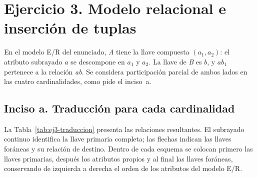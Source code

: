 
\section{Ejercicio 3. Modelo relacional e inserción de tuplas}

En el modelo E/R del enunciado, \emph{A} tiene la llave compuesta
$(a_1,a_2)$: el atributo subrayado $a$ se descompone en $a_1$ y $a_2$.
La llave de \emph{B} es $b$, y $ab_1$ pertenece a la relación \emph{ab}.
Se considera participación parcial de ambos lados en las cuatro
cardinalidades, como pide el inciso~a.

\subsection{Inciso a. Traducción para cada cardinalidad}

La Tabla~\ref{tab:ej3-traduccion} presenta las relaciones resultantes.
El subrayado continuo identifica la llave primaria completa; las flechas
indican las llaves foráneas y su relación de destino. Dentro de cada esquema
se colocan primero las llaves primarias, después los atributos propios y al
final las llaves foráneas, conservando de izquierda a derecha el orden de los
atributos del modelo E/R.

